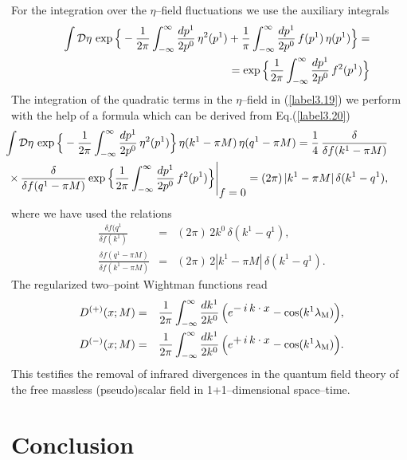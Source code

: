 \documentclass[a4paper,12pt] {article}
\begin{document}
%
For the integration over the $\eta$--field fluctuations we use the
auxiliary integrals
%
\begin{eqnarray}\label{label3.20}
&&\int{\cal D}\eta\,\exp\Big\{-\frac{1}{2\pi}
\int^{\infty}_{-\infty}\frac{dp^1}{2p^0}\, \eta^2(p^1) +
\frac{1}{\pi}\int^{\infty}_{-\infty}
\frac{dp^1}{2p^0}\,f(p^1)\,\eta(p^1)\Big\} = \nonumber\\
&&=\exp\Big\{\frac{1}{2\pi}\int^{\infty}_{-\infty}
\frac{dp^1}{2p^0}\,f^2(p^1)\Big\}
\end{eqnarray}
%
The integration of the quadratic terms in the $\eta$--field in
(\ref{label3.19}) we perform with the help of a formula which can be
derived from Eq.(\ref{label3.20})
%
\begin{eqnarray}\label{label3.21}
\hspace{-0.5in}&&\int{\cal D}\eta\,
\exp\Big\{-\frac{1}{2\pi}\int^{\infty}_{-\infty}\frac{dp^1}{2p^0}\,
\eta^2(p^1)\Big\}\,\eta(k^1 - \pi M)\, \eta(q^1 - \pi M)
= \frac{1}{4}\,\frac{\delta}{\delta f(k^1 - \pi
M)}\nonumber\\
\hspace{-0.5in}&&\times\,\frac{\delta}{\delta f(q^1 - \pi
M)}\exp\Big\{\frac{1}{2\pi}\int^{\infty}_{-\infty}
\frac{dp^1}{2p^0}\,f^2(p^1)\Big\}\Bigg|_{\textstyle f=0}=
(2\pi)\,|k^1 - \pi M|\,\delta(k^1 - q^1),
\end{eqnarray}
%
where we have used the relations
%
\begin{eqnarray}\label{label3.22}
\frac{\delta f(q^1}{\delta f(k^1)} &=& (2\pi)\,2k^0\,\delta(k^1 -
q^1),\nonumber\\ \frac{\delta f(q^1 - \pi M)}{\delta f(k^1- \pi M)}
&=& (2\pi)\,2|k^1 - \pi M|\,\delta(k^1 - q^1).
\end{eqnarray}
%
The regularized two--point Wightman functions read
%
\begin{eqnarray}\label{label3.23}
D^{(+)}(x;M) &=&
\frac{1}{2\pi}\int^{\infty}_{-\infty}\frac{dk^1}{2k^0}\,
\Big(e^{\textstyle -\,i\,k\cdot x} - \cos(k^1\lambda_{\rm
M})\Big),\nonumber\\ D^{(-)}(x;M)
&=&\frac{1}{2\pi}\int^{\infty}_{-\infty}\frac{dk^1}{2k^0}\,
\Big(e^{\textstyle +\,i\,k\cdot x} - \cos(k^1\lambda_{\rm M})\Big).
\end{eqnarray}
%
This testifies the removal of infrared divergences in the quantum
field theory of the free massless (pseudo)scalar field in
1+1--dimensional space--time.

\section{Conclusion}
\setcounter{equation}{0}
\end{document}
